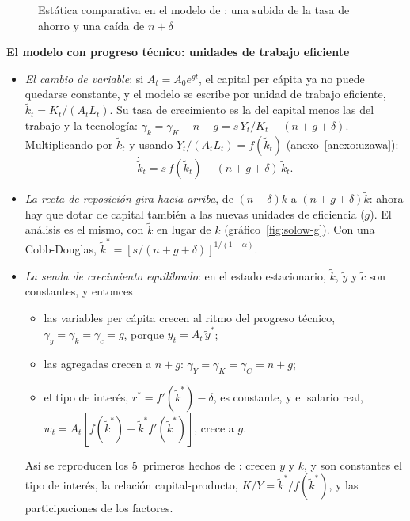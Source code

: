 \documentclass[11pt]{article}
\begin{document}
\begin{figure}[H]
\centering
\caption{Estática comparativa en el modelo de : una subida de la tasa de ahorro y una caída de $n+\delta$}\label{fig:solow-tasas}
\end{figure}

\begin{anotaciones}
\textbf{El modelo con progreso técnico: unidades de trabajo eficiente}
\begin{itemize}
\item \emph{El cambio de variable}: si $A_t=A_0e^{gt}$, el capital per cápita ya no puede quedarse constante, y el modelo se escribe por unidad de trabajo eficiente, $\tilde k_t=K_t/(A_tL_t)$. Su tasa de crecimiento es la del capital menos las del trabajo y la tecnología: $\gamma_{\tilde k}=\gamma_K-n-g=s\,Y_t/K_t-(n+g+\delta)$. Multiplicando por $\tilde k_t$ y usando $Y_t/(A_tL_t)=f(\tilde k_t)$ (anexo~\ref{anexo:uzawa}):
  \begin{equation}
  \dot{\tilde k}_t=s\,f(\tilde k_t)-(n+g+\delta)\,\tilde k_t.\label{eq:solow-g}
  \end{equation}
\item \emph{La recta de reposición gira hacia arriba}, de $(n+\delta)k$ a $(n+g+\delta)\tilde k$: ahora hay que dotar de capital también a las nuevas unidades de eficiencia ($g$). El análisis es el mismo, con $\tilde k$ en lugar de $k$ (gráfico~\ref{fig:solow-g}). Con una Cobb-Douglas, $\tilde k^*=[s/(n+g+\delta)]^{1/(1-\alpha)}$.
\item \emph{La senda de crecimiento equilibrado}: en el estado estacionario, $\tilde k$, $\tilde y$ y $\tilde c$ son constantes, y entonces
  \begin{itemize}
  \item las variables per cápita crecen al ritmo del progreso técnico, $\gamma_y=\gamma_k=\gamma_c=g$, porque $y_t=A_t\,\tilde y^*$;
  \item las agregadas crecen a $n+g$: $\gamma_Y=\gamma_K=\gamma_C=n+g$;
  \item el tipo de interés, $r^*=f'(\tilde k^*)-\delta$, es constante, y el salario real, $w_t=A_t\left[f(\tilde k^*)-\tilde k^*f'(\tilde k^*)\right]$, crece a $g$.
  \end{itemize}
  Así se reproducen los 5~primeros hechos de : crecen $y$ y $k$, y son constantes el tipo de interés, la relación capital-producto, $K/Y=\tilde k^*/f(\tilde k^*)$, y las participaciones de los factores.

\end{itemize}
\end{anotaciones}
\end{document}
